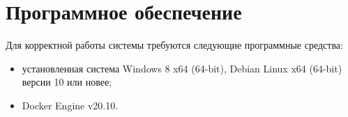 \documentclass[../nirs.tex]{subfiles}
\begin{document}
    \section{Программное обеспечение}
    Для корректной работы системы требуются следующие программные средства:

    \begin{itemize}
        \item установленная система Windows 8 x64 (64-bit),
            Debian Linux x64 (64-bit) версии 10 или новее;
        \item Docker Engine v20.10.
    \end{itemize}
\end{document}
